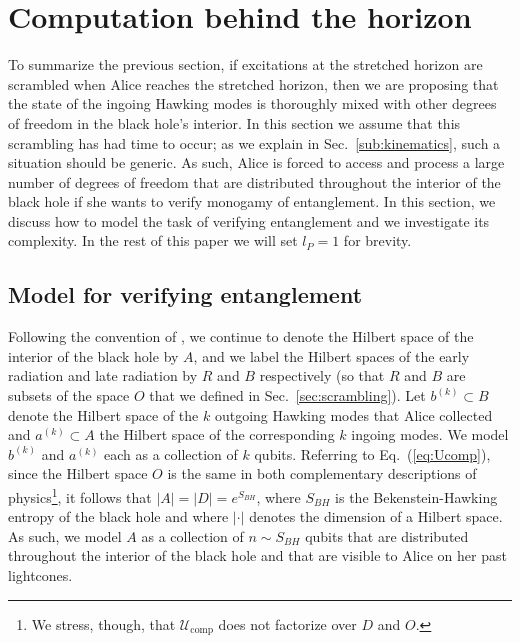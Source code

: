 \documentclass[a4paper,11pt]{article}
\theoremstyle{definition}
\newcommand{\Eq}[1]{Eq.~(\ref{#1})}
\newcommand{\Sec}[1]{Sec.~\ref{#1}}
\begin{document}
\section{Computation behind the horizon}

To summarize the previous section, if excitations at the stretched horizon are scrambled when Alice reaches the stretched horizon, then we are proposing that the state of the ingoing Hawking modes is thoroughly mixed with other degrees of freedom in the black hole's interior.
In this section we assume that this scrambling has had time to occur; as we explain in \Sec{sub:kinematics}, such a situation should be generic.
As such, Alice is forced to access and process a large number of degrees of freedom that are distributed throughout the interior of the black hole if she wants to verify monogamy of entanglement.
In this section, we discuss how to model the task of verifying entanglement and we investigate its complexity.
In the rest of this paper we will set $l_P = 1$ for brevity. 

\subsection{Model for verifying entanglement}

Following the convention of \cite{Almheiri:2012rt}, we continue to denote the Hilbert space of the interior of the black hole by $A$, and we label the Hilbert spaces of the early radiation and late radiation by $R$ and $B$ respectively (so that $R$ and $B$ are subsets of the space $O$ that we defined in \Sec{sec:scrambling}).
Let $b^{(k)} \subset B$ denote the Hilbert space of the $k$ outgoing Hawking modes that Alice collected and $a^{(k)} \subset A$ the Hilbert space of the corresponding $k$ ingoing modes.
We model $b^{(k)}$ and $a^{(k)}$ each as a collection of $k$ qubits.
Referring to \Eq{eq:Ucomp}, since the Hilbert space $O$ is the same in both complementary descriptions of physics\footnote{We stress, though, that $\mathcal{U}_\mathrm{comp}$ does not factorize over $D$ and $O$.}, it follows that $|A| = |D| = e^{S_{BH}}$, where $S_{BH}$ is the Bekenstein-Hawking entropy of the black hole and where $|\cdot|$ denotes the dimension of a Hilbert space.
As such, we model $A$ as a collection of $n \sim S_{BH}$ qubits that are distributed throughout the interior of the black hole and that are visible to Alice on her past lightcones.
\end{document}
